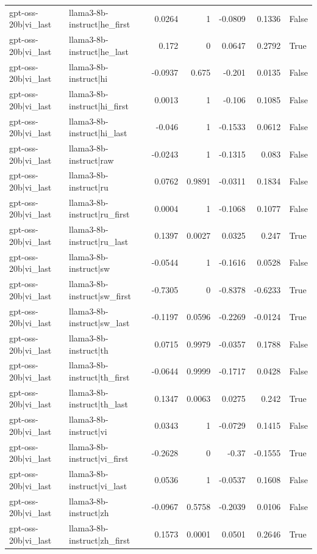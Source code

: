 \begin{table}
\begin{tabular}{l l r r r r l}
gpt-oss-20b|vi_last & llama3-8b-instruct|he_first & 0.0264 & 1 & -0.0809 & 0.1336 & False \\
gpt-oss-20b|vi_last & llama3-8b-instruct|he_last & 0.172 & 0 & 0.0647 & 0.2792 & True \\
gpt-oss-20b|vi_last & llama3-8b-instruct|hi & -0.0937 & 0.675 & -0.201 & 0.0135 & False \\
gpt-oss-20b|vi_last & llama3-8b-instruct|hi_first & 0.0013 & 1 & -0.106 & 0.1085 & False \\
gpt-oss-20b|vi_last & llama3-8b-instruct|hi_last & -0.046 & 1 & -0.1533 & 0.0612 & False \\
gpt-oss-20b|vi_last & llama3-8b-instruct|raw & -0.0243 & 1 & -0.1315 & 0.083 & False \\
gpt-oss-20b|vi_last & llama3-8b-instruct|ru & 0.0762 & 0.9891 & -0.0311 & 0.1834 & False \\
gpt-oss-20b|vi_last & llama3-8b-instruct|ru_first & 0.0004 & 1 & -0.1068 & 0.1077 & False \\
gpt-oss-20b|vi_last & llama3-8b-instruct|ru_last & 0.1397 & 0.0027 & 0.0325 & 0.247 & True \\
gpt-oss-20b|vi_last & llama3-8b-instruct|sw & -0.0544 & 1 & -0.1616 & 0.0528 & False \\
gpt-oss-20b|vi_last & llama3-8b-instruct|sw_first & -0.7305 & 0 & -0.8378 & -0.6233 & True \\
gpt-oss-20b|vi_last & llama3-8b-instruct|sw_last & -0.1197 & 0.0596 & -0.2269 & -0.0124 & True \\
gpt-oss-20b|vi_last & llama3-8b-instruct|th & 0.0715 & 0.9979 & -0.0357 & 0.1788 & False \\
gpt-oss-20b|vi_last & llama3-8b-instruct|th_first & -0.0644 & 0.9999 & -0.1717 & 0.0428 & False \\
gpt-oss-20b|vi_last & llama3-8b-instruct|th_last & 0.1347 & 0.0063 & 0.0275 & 0.242 & True \\
gpt-oss-20b|vi_last & llama3-8b-instruct|vi & 0.0343 & 1 & -0.0729 & 0.1415 & False \\
gpt-oss-20b|vi_last & llama3-8b-instruct|vi_first & -0.2628 & 0 & -0.37 & -0.1555 & True \\
gpt-oss-20b|vi_last & llama3-8b-instruct|vi_last & 0.0536 & 1 & -0.0537 & 0.1608 & False \\
gpt-oss-20b|vi_last & llama3-8b-instruct|zh & -0.0967 & 0.5758 & -0.2039 & 0.0106 & False \\
gpt-oss-20b|vi_last & llama3-8b-instruct|zh_first & 0.1573 & 0.0001 & 0.0501 & 0.2646 & True \\

\end{tabular}
\end{table}

